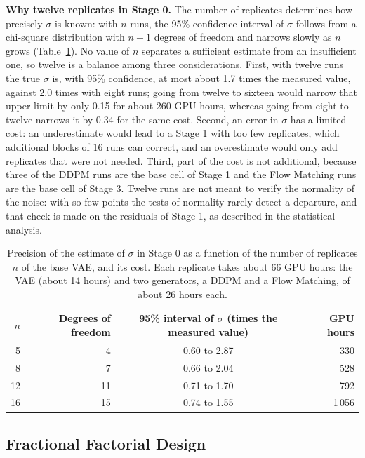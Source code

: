 \textbf{Why twelve replicates in Stage 0.} The number of replicates determines how precisely $\sigma$ is known: with $n$ runs, the 95\% confidence interval of $\sigma$ follows from a chi-square distribution with $n-1$ degrees of freedom and narrows slowly as $n$ grows (Table~\ref{tab:stage0}). No value of $n$ separates a sufficient estimate from an insufficient one, so twelve is a balance among three considerations. First, with twelve runs the true $\sigma$ is, with 95\% confidence, at most about 1.7 times the measured value, against 2.0 times with eight runs; going from twelve to sixteen would narrow that upper limit by only 0.15 for about 260 GPU hours, whereas going from eight to twelve narrows it by 0.34 for the same cost. Second, an error in $\sigma$ has a limited cost: an underestimate would lead to a Stage 1 with too few replicates, which additional blocks of 16 runs can correct, and an overestimate would only add replicates that were not needed. Third, part of the cost is not additional, because three of the DDPM runs are the base cell of Stage 1 and the Flow Matching runs are the base cell of Stage 3. Twelve runs are not meant to verify the normality of the noise: with so few points the tests of normality rarely detect a departure, and that check is made on the residuals of Stage 1, as described in the statistical analysis.

\begin{table}[H]
\centering
\small
\begin{tabular}{rrcr}
\hline
$n$ & \textbf{Degrees of freedom} & \textbf{95\% interval of $\sigma$ (times the measured value)} & \textbf{GPU hours} \\
\hline
5 & 4 & 0.60 to 2.87 & 330 \\
8 & 7 & 0.66 to 2.04 & 528 \\
12 & 11 & 0.71 to 1.70 & 792 \\
16 & 15 & 0.74 to 1.55 & 1\,056 \\
\hline
\end{tabular}
\caption{Precision of the estimate of $\sigma$ in Stage 0 as a function of the number of replicates $n$ of the base VAE, and its cost. Each replicate takes about 66 GPU hours: the VAE (about 14 hours) and two generators, a DDPM and a Flow Matching, of about 26 hours each.}
\label{tab:stage0}
\end{table}

\subsection{Fractional Factorial Design}

